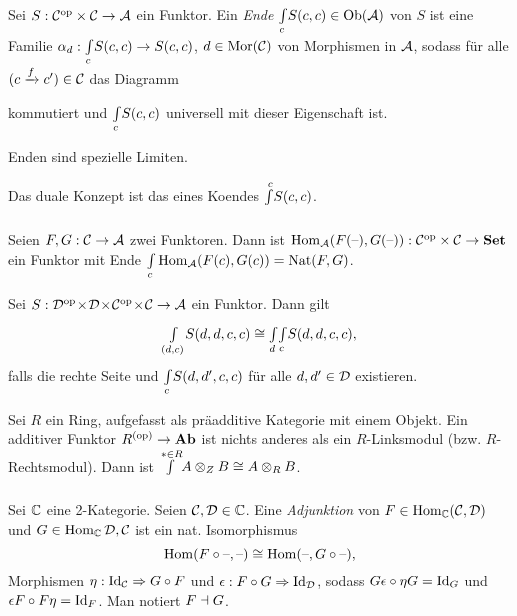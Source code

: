 \documentclass{cheat-sheet}
\begin{document}





\begin{defn}
  Sei $S : \mathcal{C}^{\mathrm{op}} \times \mathcal{C} \to \mathcal{A}$ ein Funktor. Ein \emph{Ende} ${\textstyle \int\limits_{c}^{}} S(c,c) \in \operatorname{Ob}(\mathcal{A})$ von $S$ ist eine Familie $\alpha_d : {\textstyle \int\limits_{c}^{}} S(c, c) \to S(c, c)$, $d \in \operatorname{Mor}(\mathcal{C})$ von Morphismen in $\mathcal{A}$, sodass für alle $(c \xrightarrow{f} c') \in \mathcal{C}$ das Diagramm

  \DiaTodo

  kommutiert und ${\textstyle \int\limits_{c}^{}} S(c,c)$ universell mit dieser Eigenschaft ist.
\end{defn}

\begin{bem}
  Enden sind spezielle Limiten.
\end{bem}

\begin{bem}
  Das duale Konzept ist das eines Koendes ${\textstyle \int\limits_{}^{c}} S(c, c)$.
\end{bem}

\begin{bsp}
  Seien $F, G : \mathcal{C} \to \mathcal{A}$ zwei Funktoren. Dann ist $\operatorname{Hom}_{\mathcal{A}}(F(\text{--}), G(\text{--})) : \mathcal{C}^{\mathrm{op}} \times \mathcal{C} \to \mathbf{Set}$ ein Funktor mit Ende ${\textstyle \int\limits_{c}^{}} \operatorname{Hom}_{\mathcal{A}}(F(c), G(c)) = \operatorname{Nat}(F, G)$.
\end{bsp}

\begin{satz}[Fubini]
  Sei $S : \mathcal{D}^{\mathrm{op}} \!\times\! \mathcal{D} \!\times\! \mathcal{C}^{\mathrm{op}} \!\times\! \mathcal{C} \to \mathcal{A}$ ein Funktor. Dann gilt
  \[ {\textstyle \int\limits_{(d,c)}^{}} S(d,d,c,c) \cong {\textstyle \int\limits_{d}^{}} {\textstyle \int\limits_{c}^{}} S(d,d,c,c), \]
  falls die rechte Seite und ${\textstyle \int\limits_{c}^{}} S(d,d',c,c)$ für alle $d, d' \in \mathcal{D}$ existieren.
\end{satz}

\begin{bsp}
  Sei $R$ ein Ring, aufgefasst als präadditive Kategorie mit einem Objekt.
  Ein additiver Funktor $R^{(\mathrm{op})} \to \mathbf{Ab}$ ist nichts anderes als ein $R$-Linksmodul (bzw. $R$-Rechtsmodul). Dann ist ${\textstyle \int\limits_{}^{* \in R}} A \otimes_Z B \cong A \otimes_R B$.
\end{bsp}

\begin{defn}
  Sei $\mathbb{C}$ eine 2-Kategorie. Seien $\mathcal{C}, \mathcal{D} \in \mathbb{C}$. Eine \emph{Adjunktion} von $F \in \operatorname{Hom}_{\mathbb{C}}(\mathcal{C}, \mathcal{D})$ und $G \in \operatorname{Hom}_{\mathbb{C}}{\mathcal{D}, \mathcal{C}}$ ist ein nat. Isomorphismus
  \[ \operatorname{Hom}(F \circ \text{--}, \text{--}) \cong \operatorname{Hom}(\text{--}, G \circ \text{--}), \]
  \dh{} Morphismen $\eta : \operatorname{Id}_{\mathcal{C}} \Rightarrow G \circ F$ und $\epsilon : F \circ G \Rightarrow \operatorname{Id}_{\mathcal{D}}$, sodass $G \epsilon \circ \eta G = \operatorname{Id}_G$ und $\epsilon F \circ F \eta = \operatorname{Id}_F$.
  Man notiert $F \dashv G$.
\end{defn}
\end{document}
